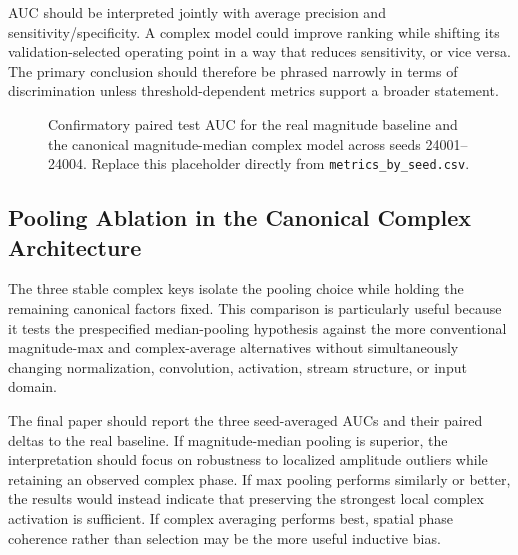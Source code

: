 \documentclass[journal]{IEEEtran}
\begin{document}
AUC should be interpreted jointly with average precision and sensitivity/specificity. A complex model could improve ranking while shifting its validation-selected operating point in a way that reduces sensitivity, or vice versa. The primary conclusion should therefore be phrased narrowly in terms of discrimination unless threshold-dependent metrics support a broader statement.

\begin{figure}[t]
\centering
{}
\caption{\small Confirmatory paired test AUC for the real magnitude baseline and the canonical magnitude-median complex model across seeds 24001--24004. Replace this placeholder directly from \texttt{metrics\_by\_seed.csv}.}
\label{fig:primarypaired}
\end{figure}

\subsection{Pooling Ablation in the Canonical Complex Architecture}
The three stable complex keys isolate the pooling choice while holding the remaining canonical factors fixed. This comparison is particularly useful because it tests the prespecified median-pooling hypothesis against the more conventional magnitude-max and complex-average alternatives without simultaneously changing normalization, convolution, activation, stream structure, or input domain.

The final paper should report the three seed-averaged AUCs and their paired deltas to the real baseline. If magnitude-median pooling is superior, the interpretation should focus on robustness to localized amplitude outliers while retaining an observed complex phase. If max pooling performs similarly or better, the results would instead indicate that preserving the strongest local complex activation is sufficient. If complex averaging performs best, spatial phase coherence rather than selection may be the more useful inductive bias.

\end{document}
